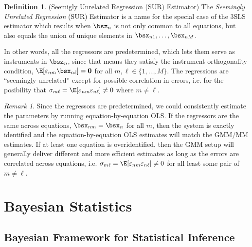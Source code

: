\documentclass[12pt]{article}
\theoremstyle{plain}
\theoremstyle{definition}
\newtheorem{defn}[thm]{Definition}
\theoremstyle{remark}
\newtheorem*{rmk}{Remark}
\renewcommand{\bso}{\boldsymbol{0}}
\begin{document}
\begin{defn}(Seemigly Unrelated Regression (SUR) Estimator)
The \emph{Seemingly Unrelated Regression} (SUR) Estimator is a name for
the special case of the 3SLS estimator which results when $\bsz_n$ is
not only common to all equations, but also equals the union of unique
elements in $\bsx_{n1},\ldots,\bsx_{nM}$.

In other words, all the regressors are predetermined, which lets them
serve as instruments in $\bsz_n$, since that means they satisfy the
instrument orthogonality condition,
$\E[\varepsilon_{nm}\bsx_{n\ell}]=\bso$ for all
$m,\ell\in\{1,\ldots,M\}$.
The regressions are
``seemingly unrelated'' except for possible correlation in errors, i.e.
for the posibility that
$\sigma_{m\ell}=\E[\varepsilon_{nm}\varepsilon_{n\ell}]\neq0$ where
$m\neq\ell$.
\end{defn}

\begin{rmk}
Since the regressors are predetermined, we could consistently estimate
the parameters by running equation-by-equation OLS. If the regressors
are the same across equations, $\bsx_{nm}=\bsx_n$ for all $m$, then the
system is exactly identified and the equation-by-equation OLS estimates
will match the GMM/MM estimates. If at least one equation is
overidentified, then the GMM setup will generally deliver different and
more efficient estimates as long as the errors are correlated across
equations, i.e.
$\sigma_{m\ell}=\E[\varepsilon_{nm}\varepsilon_{n\ell}]\neq 0$ for all
least some pair of $m\neq\ell$.
\end{rmk}


\clearpage
\section{Bayesian Statistics}

\subsection{Bayesian Framework for Statistical Inference}
\end{document}
